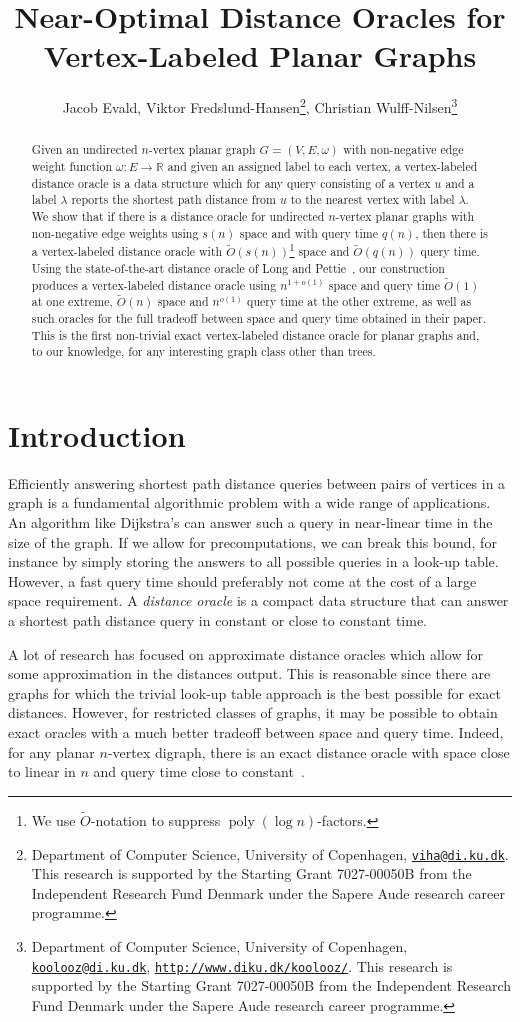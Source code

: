 \documentclass[a4paper,UKenglish,cleveref, autoref, thm-restate]{article}
\title{Near-Optimal Distance Oracles for Vertex-Labeled Planar Graphs} %
\author{Jacob Evald, Viktor Fredslund-Hansen\footnote{Department of Computer Science, University of Copenhagen, \href{mailto:viha@di.ku.dk}{\texttt{viha@di.ku.dk}}. This research is supported by the Starting Grant 7027-00050B from the Independent Research Fund Denmark under the Sapere Aude research career programme.}, Christian Wulff-Nilsen\footnote{Department of Computer Science, University of Copenhagen, \href{mailto:koolooz@di.ku.dk}{\texttt{koolooz@di.ku.dk}}, \href{http://www.diku.dk/koolooz/}{\texttt{http://www.diku.dk/koolooz/}}. This research is supported by the Starting Grant 7027-00050B from the Independent Research Fund Denmark under the Sapere Aude research career programme.}}
\def\poly{\operatorname{poly}}
\begin{document}
\maketitle

\begin{abstract}
Given an undirected $n$-vertex planar graph $G=(V,E,\omega)$ with non-negative edge weight function $\omega:E\rightarrow \mathbb R$ and given an assigned label to each vertex, a vertex-labeled distance oracle is a data structure which for any query consisting of a vertex $u$ and a label $\lambda$ reports the shortest path distance from $u$ to the nearest vertex with label $\lambda$. We show that if there is a distance oracle for undirected $n$-vertex planar graphs with non-negative edge weights using $s(n)$ space and with query time $q(n)$, then there is a vertex-labeled distance oracle with $\tilde{O}(s(n))$\footnote{We use $\tilde O$-notation to suppress $\poly(\log n)$-factors.} space and $\tilde{O}(q(n))$ query time. Using the state-of-the-art distance oracle of Long and Pettie~\cite{Long2021}, our construction produces a vertex-labeled distance oracle using $n^{1+o(1)}$ space and query time $\tilde O(1)$ at one extreme, $\tilde O(n)$ space and $n^{o(1)}$ query time at the other extreme, as well as such oracles for the full tradeoff between space and query time obtained in their paper. This is the first non-trivial exact vertex-labeled distance oracle for planar graphs and, to our knowledge, for any interesting graph class other than trees.
\end{abstract}

\newpage

\section{Introduction}\label{sec:Intro}
Efficiently answering shortest path distance queries between pairs of vertices in a graph is a fundamental algorithmic problem with a wide range of applications. An algorithm like Dijkstra's can answer such a query in near-linear time in the size of the graph. If we allow for precomputations, we can break this bound, for instance by simply storing the answers to all possible queries in a look-up table. However, a fast query time should preferably not come at the cost of a large space requirement. A \emph{distance oracle} is a compact data structure that can answer a shortest path distance query in constant or close to constant time.

A lot of research has focused on approximate distance oracles which allow for some approximation in the distances output. This is reasonable since there are graphs for which the trivial look-up table approach is the best possible for exact distances. However, for restricted classes of graphs, it may be possible to obtain exact oracles with a much better tradeoff between space and query time. Indeed, for any planar $n$-vertex digraph, there is an exact distance oracle with space close to linear in $n$ and query time close to constant~\cite{Gawrychowski2018,Charalampopoulos2019a,Long2021}.
\end{document}
